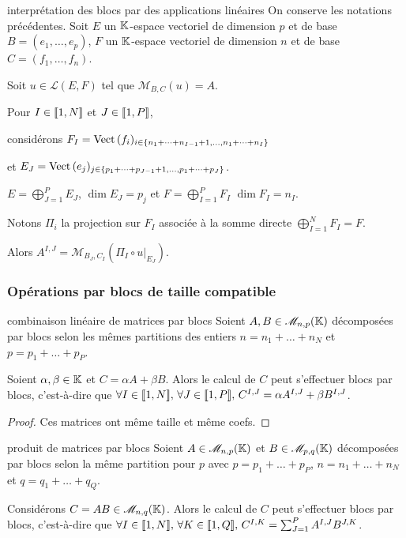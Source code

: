 \begin{proposition}{interprétation des blocs par des applications linéaires}{}
    On conserve les notations précédentes. Soit $E$ un $\mathbb{K}$-espace vectoriel de dimension $p$ et de base $B = (e_1, \dots, e_p)$,
    $F$ un $\mathbb{K}$-espace vectoriel de dimension $n$ et de base $C = (f_1, \dots, f_n)$.

    Soit $u \in \mathscr L(E, F)$ tel que $\mathscr M_{B, C}(u) = A$.

    Pour $I \in [\![1, N]\!]$ et $J \in [\![1, P]\!]$, 
    
    considérons 
    $F_I = \operatorname{Vect} \, (f_i)_{i \in \{n_1 + \dots + n_{I - 1} + 1, \dots , n_1 + \dots + n_I\}}$ 

    et $E_J = \operatorname{Vect} \, (e_j)_{j \in \{p_1 + \dots + p_{J - 1} + 1, \dots , p_1 + \dots + p_J\}}$.

    $E = \bigoplus_{J=1}^P E_J$, $\dim E_J = p_j$ et $F = \bigoplus_{I=1}^P F_I$ 
    $\dim F_I = n_I$.

    Notons $\Pi_i$ la projection sur $F_I$ associée à la somme directe $\bigoplus_{I=1}^N F_I = F$.

    Alors $A^{I, J} = \mathscr M_{B_J, C_I}(\Pi_I \circ u|_{E_J})$.
\end{proposition}

\subsubsection{Opérations par blocs de taille compatible }

\begin{proposition}{combinaison linéaire de matrices par blocs}{}
    Soient $A, B \in \mathscr M_{n, p}(\mathbb{K})$ décomposées par blocs selon les mêmes partitions des entiers 
    $n = n_1 + \dots + n_N$ et $p = p_1 + \dots + p_P$.

    Soient $\alpha, \beta \in \mathbb{K}$ et $C = \alpha A + \beta B$. Alors le calcul de $C$ peut s'effectuer 
    blocs par blocs, c'est-à-dire que 
    $\forall I \in [\![1, N]\!], \, \forall J \in [\![1, P]\!], \, C^{I, J} = \alpha A^{I, J} + \beta B^{I, J}$.
\end{proposition}

\begin{proof}
    Ces matrices ont même taille et même coefs. 
\end{proof}

\begin{proposition}{produit de matrices par blocs}{}
    Soient $A \in \mathscr M_{n, p}(\mathbb{K})$ et $B \in \mathscr M_{p, q}(\mathbb{K})$ décomposées par blocs selon la même 
    partition pour $p$ avec $p = p_1 + \dots + p_P$, $n = n_1 + \dots + n_N$ et $q = q_1 + \dots + q_Q$.
    
    Considérons $C = AB \in \mathscr M_{n, q}(\mathbb{K})$. Alors le calcul de $C$ peut s'effectuer blocs par blocs, c'est-à-dire que 
    $\forall I \in [\![1, N]\!], \, \forall K \in [\![1, Q]\!], \, C^{I, K} = \sum_{J=1}^P A^{I, J} B^{J, K}$.
\end{proposition}


